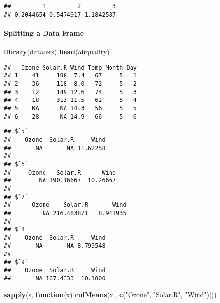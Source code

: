 \documentclass[
]{article}
\newenvironment{Shaded}{\begin{snugshade}}{\end{snugshade}}
\newcommand{\ControlFlowTok}[1]{\textcolor[rgb]{0.13,0.29,0.53}{\textbf{#1}}}
\newcommand{\KeywordTok}[1]{\textcolor[rgb]{0.13,0.29,0.53}{\textbf{#1}}}
\newcommand{\NormalTok}[1]{#1}
\newcommand{\OperatorTok}[1]{\textcolor[rgb]{0.81,0.36,0.00}{\textbf{#1}}}
\newcommand{\StringTok}[1]{\textcolor[rgb]{0.31,0.60,0.02}{#1}}
\begin{document}
\begin{verbatim}
##         1         2         3 
## 0.2044654 0.5474917 1.1842587
\end{verbatim}

\hypertarget{splitting-a-data-frame}{%
\paragraph{Splitting a Data Frame}\label{splitting-a-data-frame}}

\begin{Shaded}
\begin{Highlighting}[]
\KeywordTok{library}\NormalTok{(datasets)}
\KeywordTok{head}\NormalTok{(airquality)}
\end{Highlighting}
\end{Shaded}

\begin{verbatim}
##   Ozone Solar.R Wind Temp Month Day
## 1    41     190  7.4   67     5   1
## 2    36     118  8.0   72     5   2
## 3    12     149 12.6   74     5   3
## 4    18     313 11.5   62     5   4
## 5    NA      NA 14.3   56     5   5
## 6    28      NA 14.9   66     5   6
\end{verbatim}

\begin{Shaded}
\end{Shaded}

\begin{verbatim}
## $`5`
##    Ozone  Solar.R     Wind 
##       NA       NA 11.62258 
## 
## $`6`
##     Ozone   Solar.R      Wind 
##        NA 190.16667  10.26667 
## 
## $`7`
##      Ozone    Solar.R       Wind 
##         NA 216.483871   8.941935 
## 
## $`8`
##    Ozone  Solar.R     Wind 
##       NA       NA 8.793548 
## 
## $`9`
##    Ozone  Solar.R     Wind 
##       NA 167.4333  10.1800
\end{verbatim}

\begin{Shaded}
\begin{Highlighting}[]
\KeywordTok{sapply}\NormalTok{(s, }\ControlFlowTok{function}\NormalTok{(x) }\KeywordTok{colMeans}\NormalTok{(x[, }\KeywordTok{c}\NormalTok{(}\StringTok{"Ozone"}\NormalTok{, }\StringTok{"Solar.R"}\NormalTok{, }\StringTok{"Wind"}\NormalTok{)]))}
\end{Highlighting}
\end{Shaded}
\end{document}
